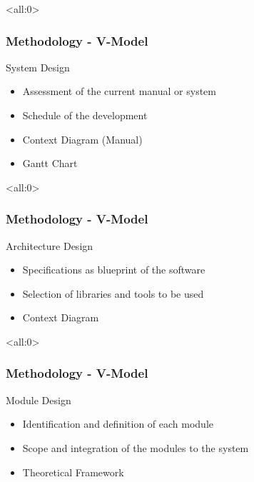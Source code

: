 \documentclass[handout]{beamer}
\begin{document}
\begin{frame}<all:0>
	\frametitle{Methodology - V-Model}
	\begin{block}{System Design}
		\begin{itemize}
			\item<1-> Assessment of the current manual or system
			\item<2-> Schedule of the development
		\end{itemize}

		\begin{itemize}
			\item<3-> Context Diagram (Manual)
			\item<4-> Gantt Chart
		\end{itemize}
	\end{block}
\end{frame}

\begin{frame}<all:0>
	\frametitle{Methodology - V-Model}
	\begin{block}{Architecture Design}
		\begin{itemize}
			\item<1-> Specifications as blueprint of the software
			\item<2-> Selection of libraries and tools to be used
		\end{itemize}

		\begin{itemize}
			\item<3-> Context Diagram
		\end{itemize}
	\end{block}
\end{frame}

\begin{frame}<all:0>
	\frametitle{Methodology - V-Model}
	\begin{block}{Module Design}
		\begin{itemize}
			\item<1-> Identification and definition of each module
			\item<2-> Scope and integration of the modules to the system
		\end{itemize}

		\begin{itemize}
			\item<3-> Theoretical Framework
		\end{itemize}
	\end{block}
\end{frame}
\end{document}
